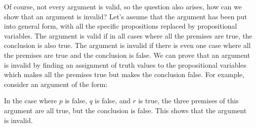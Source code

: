 Of course, not every argument is valid, so the question also
arises, how can we show that an argument is invalid?  Let's
assume that the argument has been put into general form, with
all the specific propositions replaced by propositional variables.
The argument is valid if in all cases where all the premises are
true, the conclusion is also true.  The argument is invalid if
there is even one case where all the premises are true and the
conclusion is false.  We can prove that an argument is invalid
by finding an assignment of truth values to the propositional variables
which makes all the premises true but makes the conclusion false.
For example, consider an argument of the form:
\begin{center}
\end{center}
In the case where $p$ is false, $q$ is false, and $r$ is true,
the three premises of this argument are all true, but the conclusion
is false.  This shows that the argument is invalid.

